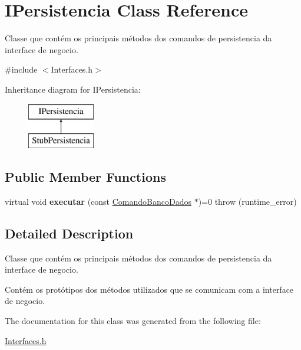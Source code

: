 \hypertarget{class_i_persistencia}{}\section{I\+Persistencia Class Reference}
\label{class_i_persistencia}


Classe que contém os principais métodos dos comandos de persistencia da interface de negocio.  




{\ttfamily \#include $<$Interfaces.\+h$>$}

Inheritance diagram for I\+Persistencia\+:\begin{figure}[H]
\begin{center}
\leavevmode
\includegraphics[height=2.000000cm]{class_i_persistencia}
\end{center}
\end{figure}
\subsection*{Public Member Functions}
\begin{DoxyCompactItemize}
\item 
\hypertarget{class_i_persistencia_aa821809bdcbc98729df56031ad7615db}{}\label{class_i_persistencia_aa821809bdcbc98729df56031ad7615db} 
virtual void {\bfseries executar} (const \hyperlink{class_comando_banco_dados}{Comando\+Banco\+Dados} $\ast$)=0  throw (runtime\+\_\+error)
\end{DoxyCompactItemize}


\subsection{Detailed Description}
Classe que contém os principais métodos dos comandos de persistencia da interface de negocio. 

Contém os protótipos dos métodos utilizados que se comunicam com a interface de negocio. 

The documentation for this class was generated from the following file\+:\begin{DoxyCompactItemize}
\item 
\hyperlink{_interfaces_8h}{Interfaces.\+h}\end{DoxyCompactItemize}
